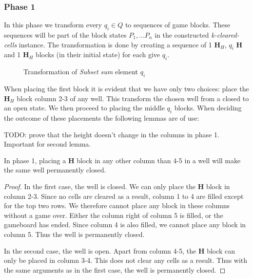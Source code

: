 \subsubsection{Phase 1}
In this phase we transform every $q_i \in Q$ to sequences of game blocks. These sequences will be part of the block states $P_1, \ldots P_n$ in the constructed \textit{k-cleared-cells} instance. The transformation is done by creating a sequence of 1 $\mathbf{H}_{H}$, $q_i$ $\mathbf{H}$ and 1 $\mathbf{H}_H$ blocks (in their initial state) for each give $q_i$.

\begin{figure}[H]
    \centering
    \caption{Transformation of \textit{Subset sum} element $q_i$}
    \label{fig:wells}
\end{figure}

When placing the first block it is evident that we have only two choices: place the $\mathbf{H}_H$ block column 2-3 of any well. This transform the chosen well from a closed to an open state. We then proceed to placing the middle $q_i$ blocks. When deciding the outcome of these placements the following lemmas are of use:\\

\begin{lem}
TODO: prove that the height doesn't change in the columns in phase 1. Important for second lemma.
\end{lem}

\bigbreak

\begin{lem}
\label{lem:permclose}
In phase 1, placing a $\mathbf{H}$ block in any other column than 4-5 in a well will make the same well permanently closed.
\end{lem}

\begin{proof}
In the first case, the well is closed. We can only place the $\mathbf{H}$ block in column 2-3. Since no cells are cleared as a result, column 1 to 4 are filled except for the top two rows. We therefore cannot place any block in these columns without a game over. Either the column right of column 5 is filled, or the gameboard has ended. Since column 4 is also filled, we cannot place any block in column 5. Thus the well is permanently closed.

In the second case, the well is open. Apart from column 4-5, the $\mathbf{H}$ block can only be placed in column 3-4. This does not clear any cells as a result. Thus with the same arguments as in the first case, the well is permanently closed.
\end{proof}

